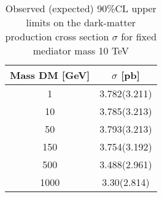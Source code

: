\begin{table}[ht]
\centering
\begin{tabular}{cc}
\hline\hline
Mass DM [GeV] & $\sigma$ [pb] \\
\hline
1  & 3.782(3.211)  \\  
\hline
10  & 3.785(3.213) \\
\hline
50  & 3.793(3.213) \\
\hline
150  & 3.754(3.192)\\
\hline
500  & 3.488(2.961)\\
\hline
1000  & 3.30(2.814)\\
\hline
\end{tabular}
\caption{Observed (expected) 90\%CL upper limits on the dark-matter production cross section $\sigma$ for fixed mediator mass 10 TeV }
\label{table:avxslimits}
\end{table}





